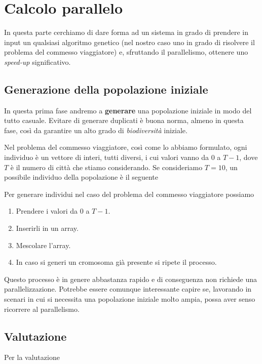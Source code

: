 \section{Calcolo parallelo}

In questa parte cerchiamo di dare forma ad un sistema in grado di prendere
in input un qualsiasi algoritmo genetico (nel nostro caso uno in grado di
risolvere il problema del commesso viaggiatore) e, sfruttando il parallelismo,
ottenere uno \emph{speed-up} significativo.

\subsection{Generazione della popolazione iniziale}

In questa prima fase andremo a \textbf{generare} una popolazione iniziale in
modo del tutto casuale. Evitare di generare duplicati è buona norma, almeno
in questa fase, così da garantire un alto grado di \emph{biodiversità} iniziale.

Nel problema del commesso viaggiatore, così come lo abbiamo formulato, ogni
individuo è un vettore di interi, tutti diversi, i cui valori vanno da $0$ a
$T-1$, dove $T$ è il numero di città che stiamo considerando. Se consideriamo
$T = 10$, un possibile individuo della popolazione è il seguente
\begin{center}
	
\end{center}
Per generare individui nel caso del problema del commesso viaggiatore possiamo
\begin{enumerate}
	\item Prendere i valori da $0$ a $T-1$.
	\item Inserirli in un array.
	\item Mescolare l'array.
	\item In caso si generi un cromosoma già presente si ripete il processo.
\end{enumerate}
Questo processo è in genere abbastanza rapido e di conseguenza non richiede
una parallelizzazione. Potrebbe essere comunque interessante capire se,
lavorando in scenari in cui si necessita una popolazione iniziale molto ampia,
possa aver senso ricorrere al parallelismo.

\subsection{Valutazione}

Per la valutazione


